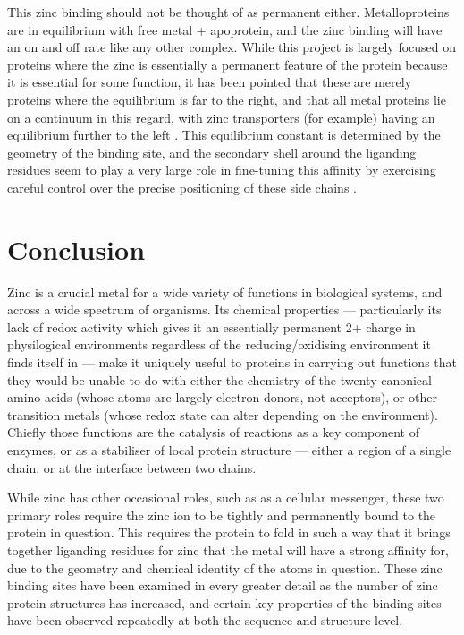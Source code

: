 This zinc binding should not be thought of as permanent either. Metalloproteins are in equilibrium with free metal + apoprotein, and the zinc binding will have an on and off rate like any other complex. While this project is largely focused on proteins where the zinc is essentially a permanent feature of the protein because it is essential for some function, it has been pointed that these are merely proteins where the equilibrium is far to the right, and that all metal proteins lie on a continuum in this regard, with zinc transporters (for example) having an equilibrium further to the left \cite{maret2010metalloproteomics}. This equilibrium constant is determined by the geometry of the binding site, and the secondary shell around the liganding residues seem to play a very large role in fine-tuning this affinity by exercising careful control over the precise positioning of these side chains \cite{kochanczyk2015relationship}.

\section{Conclusion}

Zinc is a crucial metal for a wide variety of functions in biological systems, and across a wide spectrum of organisms. Its chemical properties --- particularly its lack of redox activity which gives it an essentially permanent 2+ charge in physilogical environments regardless of the reducing/oxidising environment it finds itself in --- make it uniquely useful to proteins in carrying out functions that they would be unable to do with either the chemistry of the twenty canonical amino acids (whose atoms are largely electron donors, not acceptors), or other transition metals (whose redox state can alter depending on the environment). Chiefly those functions are the catalysis of reactions as a key component of enzymes, or as a stabiliser of local protein structure --- either a region of a single chain, or at the interface between two chains.

While zinc has other occasional roles, such as as a cellular messenger, these two primary roles require the zinc ion to be tightly and permanently bound to the protein in question. This requires the protein to fold in such a way that it brings together liganding residues for zinc that the metal will have a strong affinity for, due to the geometry and chemical identity of the atoms in question. These zinc binding sites have been examined in every greater detail as the number of zinc protein structures has increased, and certain key properties of the binding sites have been observed repeatedly at both the sequence and structure level.

